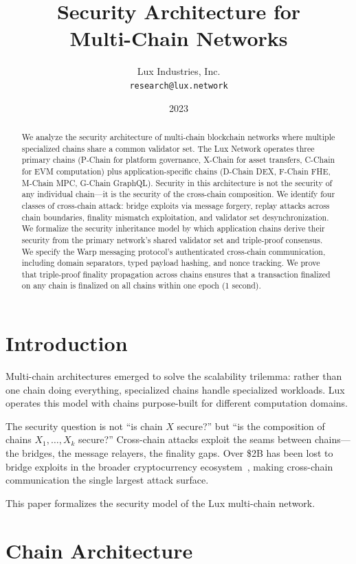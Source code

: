 \documentclass[11pt,a4paper]{article}
\title{Security Architecture for\\Multi-Chain Networks}
\author{
Lux Industries, Inc.\\
\texttt{research@lux.network}
}
\date{2023}
\begin{document}
\luxcoverpage

\begin{abstract}
We analyze the security architecture of multi-chain blockchain networks where multiple specialized chains share a common validator set. The Lux Network operates three primary chains (P-Chain for platform governance, X-Chain for asset transfers, C-Chain for EVM computation) plus application-specific chains (D-Chain DEX, F-Chain FHE, M-Chain MPC, G-Chain GraphQL). Security in this architecture is not the security of any individual chain---it is the security of the cross-chain composition. We identify four classes of cross-chain attack: bridge exploits via message forgery, replay attacks across chain boundaries, finality mismatch exploitation, and validator set desynchronization. We formalize the security inheritance model by which application chains derive their security from the primary network's shared validator set and triple-proof consensus. We specify the Warp messaging protocol's authenticated cross-chain communication, including domain separators, typed payload hashing, and nonce tracking. We prove that triple-proof finality propagation across chains ensures that a transaction finalized on any chain is finalized on all chains within one epoch (1 second).
\end{abstract}

\section{Introduction}

Multi-chain architectures emerged to solve the scalability trilemma: rather than one chain doing everything, specialized chains handle specialized workloads. Lux operates this model with chains purpose-built for different computation domains.

The security question is not ``is chain $X$ secure?'' but ``is the composition of chains $X_1, \ldots, X_k$ secure?'' Cross-chain attacks exploit the seams between chains---the bridges, the message relayers, the finality gaps. Over \$2B has been lost to bridge exploits in the broader cryptocurrency ecosystem~\cite{bridge-losses}, making cross-chain communication the single largest attack surface.

This paper formalizes the security model of the Lux multi-chain network.

\section{Chain Architecture}
\end{document}
